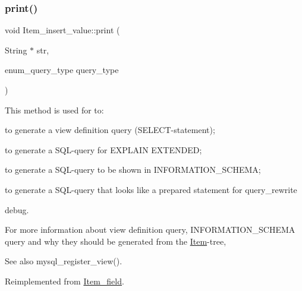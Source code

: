 \mbox{\label{classItem__insert__value_abbba2f565d5a63803b693a03f7184d14}} 
\subsubsection{\texorpdfstring{print()}{print()}}
{\footnotesize\ttfamily void Item\+\_\+insert\+\_\+value\+::print (\begin{DoxyParamCaption}\item[{String $\ast$}]{str,  }\item[{enum\+\_\+query\+\_\+type}]{query\+\_\+type }\end{DoxyParamCaption})\hspace{0.3cm}{\ttfamily [virtual]}}

This method is used for to\+:
\begin{DoxyItemize}
\item to generate a view definition query (S\+E\+L\+E\+CT-\/statement);
\item to generate a S\+QL-\/query for E\+X\+P\+L\+A\+IN E\+X\+T\+E\+N\+D\+ED;
\item to generate a S\+QL-\/query to be shown in I\+N\+F\+O\+R\+M\+A\+T\+I\+O\+N\+\_\+\+S\+C\+H\+E\+MA;
\item to generate a S\+QL-\/query that looks like a prepared statement for query\+\_\+rewrite
\item debug.
\end{DoxyItemize}

For more information about view definition query, I\+N\+F\+O\+R\+M\+A\+T\+I\+O\+N\+\_\+\+S\+C\+H\+E\+MA query and why they should be generated from the \mbox{\hyperlink{classItem}{Item}}-\/tree, \begin{DoxySeeAlso}{See also}
mysql\+\_\+register\+\_\+view(). 
\end{DoxySeeAlso}


Reimplemented from \mbox{\hyperlink{classItem__field_a40b28e2bc9886f81e8ad19c64efb1408}{Item\+\_\+field}}.

\mbox{\label{classItem__insert__value_a66064a4540fb76d611f806c195c40886}} 
